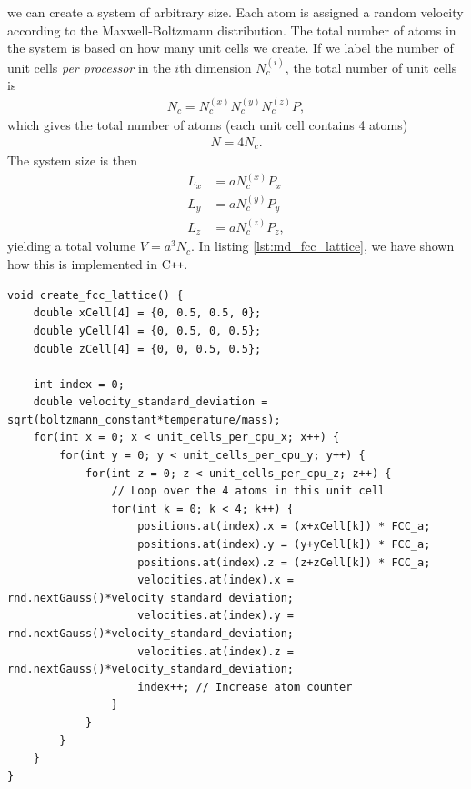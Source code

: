 we can create a system of arbitrary size. Each atom is assigned a random velocity according to the Maxwell-Boltzmann distribution. The total number of atoms in the system is based on how many unit cells we create. If we label the number of unit cells \textit{per processor} in the $i$th dimension $N_c^{(i)}$, the total number of unit cells is
\begin{align}
	N_c = N_c^{(x)}N_c^{(y)}N_c^{(z)} P,
\end{align}
which gives the total number of atoms (each unit cell contains 4 atoms)
\begin{align}
	N = 4N_c.
\end{align}
The system size is then
\begin{align}
	L_x &= aN_c^{(x)}P_x\\
	L_y &= aN_c^{(y)}P_y\\
	L_z &= aN_c^{(z)}P_z,
\end{align}
yielding a total volume $V = a^3N_c$. In listing \ref{lst:md_fcc_lattice}, we have shown how this is implemented in C{}\verb!++!.
\begin{lstlisting}[caption=Code example showing how to create an FCC lattice on one of the processors., label=lst:md_fcc_lattice]
void create_fcc_lattice() {
    double xCell[4] = {0, 0.5, 0.5, 0};
    double yCell[4] = {0, 0.5, 0, 0.5};
    double zCell[4] = {0, 0, 0.5, 0.5};

    int index = 0;
    double velocity_standard_deviation = sqrt(boltzmann_constant*temperature/mass);
    for(int x = 0; x < unit_cells_per_cpu_x; x++) {
        for(int y = 0; y < unit_cells_per_cpu_y; y++) {
            for(int z = 0; z < unit_cells_per_cpu_z; z++) {
                // Loop over the 4 atoms in this unit cell
                for(int k = 0; k < 4; k++) {
                    positions.at(index).x = (x+xCell[k]) * FCC_a;
                    positions.at(index).y = (y+yCell[k]) * FCC_a;
                    positions.at(index).z = (z+zCell[k]) * FCC_a;
                    velocities.at(index).x = rnd.nextGauss()*velocity_standard_deviation;
                    velocities.at(index).y = rnd.nextGauss()*velocity_standard_deviation;
                    velocities.at(index).z = rnd.nextGauss()*velocity_standard_deviation;
                    index++; // Increase atom counter
                }
            }
        }
    }
}
\end{lstlisting}